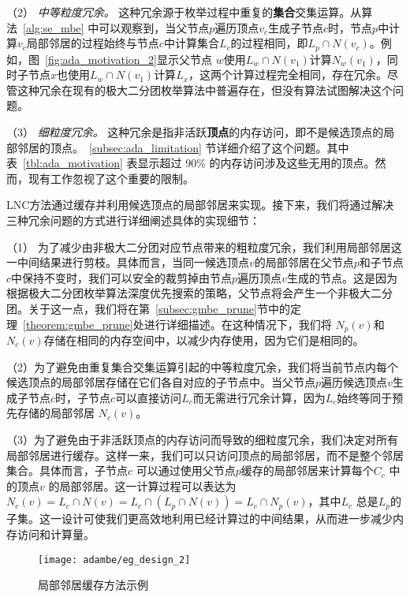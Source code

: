 （2） \emph{\textit{中等粒度冗余。}}
这种冗余源于枚举过程中重复的\textbf{集合}交集运算。从算法~\ref{alg:se_mbe} 中可以观察到，当父节点$p$遍历顶点$v_c$生成子节点$c$时，节点$p$中计算$v_c$局部邻居的过程始终与节点$c$中计算集合$L_c$的过程相同，即$L_p\cap N(v_c)$。例如，图~\ref{fig:ada_motivation_2}显示父节点 $w$使用$L_w\cap N(v_1)$计算$N_w(v_1)$，同时子节点$x$也使用$L_w\cap N(v_1)$计算$L_x$，这两个计算过程完全相同，存在冗余。尽管这种冗余在现有的极大二分团枚举算法中普遍存在，但没有算法试图解决这个问题。

（3） \emph{\textit{细粒度冗余。}}
这种冗余是指非活跃\textbf{顶点}的内存访问，即不是候选顶点的局部邻居的顶点。~\ref{subsec:ada_limitation} 节详细介绍了这个问题。其中表~\ref{tbl:ada_motivation} 表显示超过 90\% 的内存访问涉及这些无用的顶点。然而，现有工作忽视了这个重要的限制。

LNC方法通过缓存并利用候选顶点的局部邻居来实现。接下来，我们将通过解决三种冗余问题的方式进行详细阐述具体的实现细节：

（1） 为了减少由非极大二分团对应节点带来的粗粒度冗余，我们利用局部邻居这一中间结果进行剪枝。具体而言，当同一候选顶点$v$的局部邻居在父节点$p$和子节点$c$中保持不变时，我们可以安全的裁剪掉由节点$p$遍历顶点$v$生成的节点。这是因为根据极大二分团枚举算法深度优先搜索的策略，父节点将会产生一个非极大二分团。关于这一点，我们将在第~\ref{subsec:gmbe_prune}节中的定理~\ref{theorem:gmbe_prune}处进行详细描述。在这种情况下，我们将 $N_p(v)$和$N_c(v)$存储在相同的内存空间中，以减少内存使用，因为它们是相同的。

（2）为了避免由重复集合交集运算引起的中等粒度冗余，我们将当前节点内每个候选顶点的局部邻居存储在它们各自对应的子节点中。当父节点$p$遍历候选顶点$v$生成子节点$c$时，子节点$c$可以直接访问$L_c$而无需进行冗余计算，因为$L_c$始终等同于预先存储的局部邻居 $N_c(v)$。

（3）为了避免由于非活跃顶点的内存访问而导致的细粒度冗余，我们决定对所有局部邻居进行缓存。这样一来，我们可以只访问顶点的局部邻居，而不是整个邻居集合。具体而言，子节点$c$ 可以通过使用父节点$p$缓存的局部邻居来计算每个$C_c$ 中的顶点$v$ 的局部邻居。这一计算过程可以表达为$N_c(v) = L_c \cap N(v) = L_c \cap (L_p \cap N(v)) = L_c \cap N_p(v)$，其中$L_c$ 总是$L_p$的子集。这一设计可使我们更高效地利用已经计算过的中间结果，从而进一步减少内存访问和计算量。



\begin{figure} [H]
	\centering
  \vspace{0.1in}
	\texttt{[image: adambe/eg\_design\_2]}
	\caption{局部邻居缓存方法示例}

	\label{fig:ada_design2}
\end{figure}

